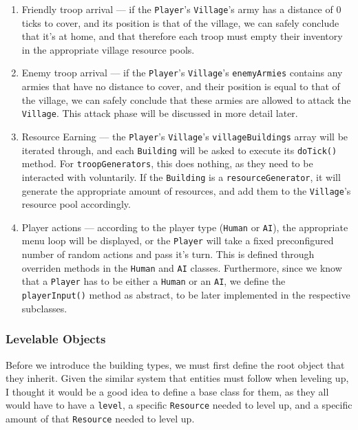 \documentclass{article}
\newcommand{\code}[1]{\texttt{#1}}
\begin{document}
\begin{enumerate}
	\item Friendly troop arrival --- if the \code{Player}'s \code{Village}'s army has a
	      distance of 0 ticks to cover, and its position is that of the village, we
	      can safely conclude that it's at home, and that therefore each troop must
	      empty their inventory in the appropriate village resource pools.
	\item Enemy troop arrival --- if the \code{Player}'s \code{Village}'s
	      \code{enemyArmies} contains any armies that have no distance to cover, and
	      their position is equal to that of the village, we can safely conclude that these armies 
	      are allowed to attack the \code{Village}. This attack phase will be discussed in more detail later.
	\item Resource Earning --- the \code{Player}'s \code{Village}'s
	      \code{villageBuildings} array will be iterated through, and each
	      \code{Building} will be asked to execute its \code{doTick()} method. For
	      \code{troopGenerators}, this does nothing, as they need to be interacted
	      with voluntarily. If the \code{Building} is a \code{resourceGenerator}, it
	      will generate the appropriate amount of resources, and add them to the
	      \code{Village}'s resource pool accordingly.
	\item Player actions --- according to the player type (\code{Human} or
	      \code{AI}), the appropriate menu loop will be displayed, or the
	      \code{Player} will take a fixed preconfigured number of random actions and pass it's
	      turn. This is defined through overriden methods in the \code{Human}
	      and \code{AI} classes. Furthermore, since we know that a \code{Player}
	      has to be either a \code{Human} or an \code{AI}, we define the
	      \code{playerInput()} method as abstract, to be later implemented in
	      the respective subclasses.
\end{enumerate}


\subsubsection*{Levelable Objects}

Before we introduce the building types, we must first define the root object
that they inherit. Given the similar system that entities must follow when
leveling up, I thought it would be a good idea to define a base class for them,
as they all would have to have a \code{level}, a specific \code{Resource} needed
to level up, and a specific amount of that \code{Resource} needed to level up. 
\end{document}
